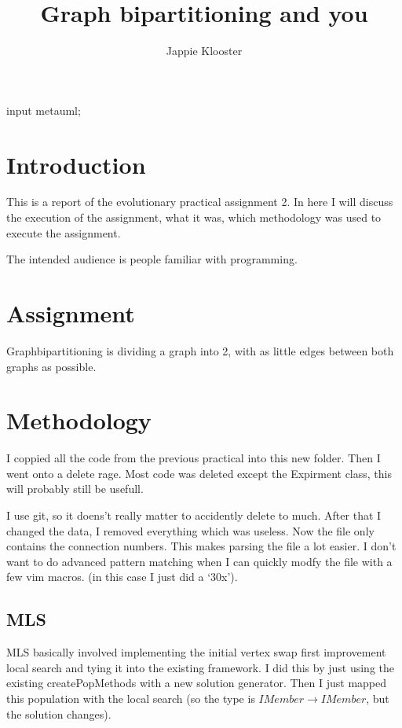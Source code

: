 \documentclass{article}
\begin{document}
\begin{empfile}
\begin{empcmds}
input metauml;
\end{empcmds}
\author{Jappie Klooster}
\title{Graph bipartitioning and you}
\maketitle

\section{Introduction}
This is a report of the evolutionary practical assignment 2.
In here I will discuss the execution of the assignment, what it was, which
methodology was used to execute the assignment.

The intended audience is people familiar with programming.

\section{Assignment}
Graphbipartitioning is dividing a graph into 2, with as little edges between
both graphs as possible.

\section{Methodology}
I coppied all the code from the previous practical into this new folder.
Then I went onto a delete rage. Most code was deleted except the Expirment
class, this will probably still be usefull.

I use git, so it doens't really matter to accidently delete to much. After
that I changed the data, I removed everything which was useless. Now the file
only contains the connection numbers. This makes parsing the file a lot
easier. I don't want to do advanced pattern matching when I can quickly modfy
the file with a few vim macros. (in this case I just did a `30x').

\subsection{MLS}
MLS basically involved implementing the initial vertex swap first improvement
local search and tying it into the existing framework. I did this by just
using the existing createPopMethods with a new solution generator. Then
I just mapped this population with the local search (so the type is
$IMember \to IMember$, but the solution changes).


\end{empfile}
\end{document}
